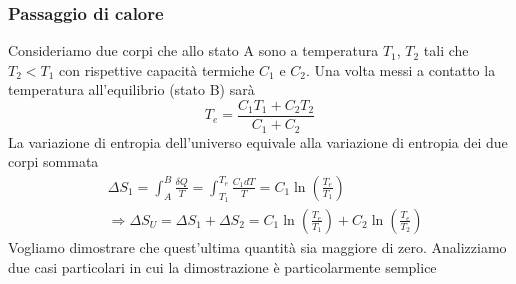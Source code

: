 \documentclass[
10pt, %
a4paper, %
oneside, %
headinclude,footinclude, %
BCOR5mm, %
]{scrartcl}
\begin{document}
\subsubsection*{Passaggio di calore}
Consideriamo due corpi che allo stato A sono a temperatura \(T_1\), \(T_2\) tali che \(T_2<T_1\)  con rispettive capacità termiche \(C_1\) e \(C_2\). Una volta messi a contatto la temperatura all'equilibrio (stato B) sarà
\[T_e=\frac{C_1T_1 + C_2T_2}{C_1+C_2}\]
La variazione di entropia dell'universo equivale alla variazione di entropia dei due corpi sommata
\begin{align*}
	&\Delta S_1 = \int_{A}^{B}\frac{\delta Q}{T} = \int_{T_1}^{T_e}\frac{C_1 dT}{T}=C_1 \ln\left(\frac{T_e}{T_1}\right)\\
	&\Rightarrow \Delta S_U = \Delta S_1 + \Delta S_2 = C_1 \ln\left(\frac{T_e}{T_1}\right) + C_2 \ln\left(\frac{T_e}{T_2}\right)
\end{align*}
Vogliamo dimostrare che quest'ultima quantità sia maggiore di zero. Analizziamo due casi particolari in cui la dimostrazione è particolarmente semplice
\end{document}
